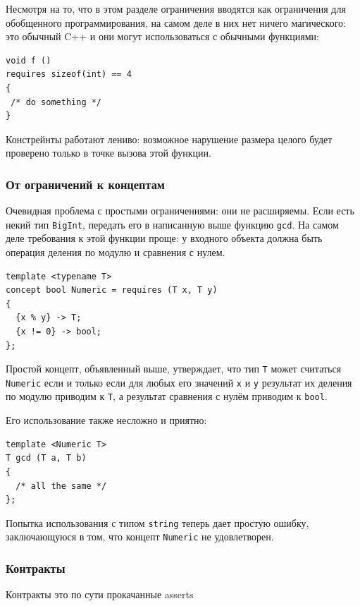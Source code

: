 \documentclass[a4paper,12pt,oneside]{article}
\begin{document}
Несмотря на то, что в этом разделе ограничения вводятся как ограничения для обобщенного программирования, на самом деле в них нет ничего магического: это обычный C++ и они могут использоваться с обычными функциями:

\begin{lstlisting}
void f ()
requires sizeof(int) == 4
{
 /* do something */
}
\end{lstlisting}

Констрейнты работают лениво: возможное нарушение размера целого будет проверено только в точке вызова этой функции.

\subsubsection{От ограничений к концептам}

Очевидная проблема с простыми ограничениями: они не расширяемы. Если есть некий тип \lstinline!BigInt!, передать его в написанную выше функцию \lstinline!gcd!. На самом деле требования к этой функции проще: у входного объекта должна быть операция деления по модулю и сравнения с нулем.

\begin{lstlisting}
template <typename T>
concept bool Numeric = requires (T x, T y)
{
  {x % y} -> T;
  {x != 0} -> bool;
};
\end{lstlisting}

Простой концепт, объявленный выше, утверждает, что тип \lstinline!T! может считаться \lstinline!Numeric! если и только если для любых его значений \lstinline!x! и \lstinline!y! результат их деления по модулю приводим к \lstinline!T!, а результат сравнения с нулём приводим к \lstinline!bool!.

Его использование также несложно и приятно:

\begin{lstlisting}
template <Numeric T>
T gcd (T a, T b)
{
  /* all the same */
};
\end{lstlisting}

Попытка использования с типом \lstinline!string! теперь дает простую ошибку, заключающуюся в том, что концепт \lstinline!Numeric! не удовлетворен.

\subsubsection{Контракты}\label{Contracts}

Контракты это по сути прокачанные asserts
\end{document}
